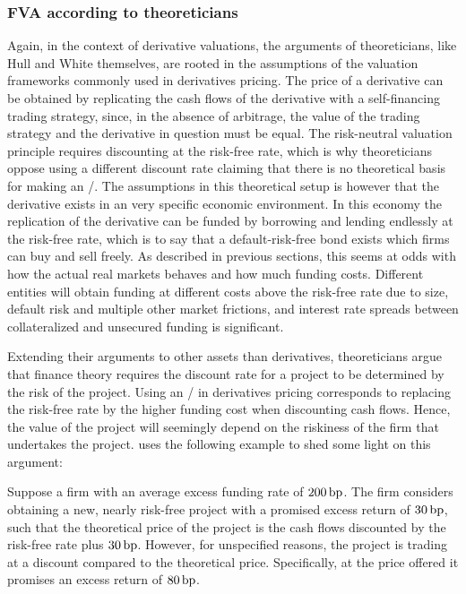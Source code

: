 \documentclass[./sub-main.tex]{subfiles}
\begin{document}
        \subsubsection{FVA according to theoreticians}
            Again, in the context of derivative valuations, 
            the arguments of theoreticians, like Hull and White themselves, 
            are rooted in the assumptions of the valuation frameworks commonly used in derivatives pricing.
            The price of a derivative can be obtained by replicating the cash flows of the derivative 
            with a self-financing trading strategy, since, in the absence of arbitrage, 
            the value of the trading strategy and the derivative in question must be equal.
            The risk-neutral valuation principle requires discounting at the risk-free rate,
            which is why theoreticians oppose using a different discount rate
            claiming that there is no theoretical basis for making an \FVA/.
            The assumptions in this theoretical setup is however 
            that the derivative exists in an very specific economic environment. 
            In this economy the replication of the derivative
            can be funded by borrowing and lending endlessly at the risk-free rate,
            which is to say that a default-risk-free bond exists which firms can buy and sell freely.
            As described in previous sections,
            this seems at odds with how the actual real markets behaves and how much funding costs.
            Different entities will obtain funding at different costs above the risk-free rate due to size,
            default risk and multiple other market frictions,
            and interest rate spreads between collateralized and unsecured funding is significant.

            Extending their arguments to other assets than derivatives, 
            theoreticians argue that finance theory requires the discount rate for a project 
            to be determined by the risk of the project.
            Using an \FVA/ in derivatives pricing corresponds to replacing the risk-free rate by the higher funding cost
            when discounting cash flows.
            Hence, the value of the project will seemingly depend on the riskiness of the firm that undertakes the project.
            \cite{HullWhite2012FVA} uses the following example to shed some light on this argument:

            Suppose a firm with an average excess funding rate of $200\,\text{bp}$. 
            The firm considers obtaining a new, nearly risk-free project with a promised excess return of $30\,\text{bp}$,
            such that the theoretical price of the project is the cash flows 
            discounted by the risk-free rate plus $30\,\text{bp}$.
            However, for unspecified reasons, the project is trading at a discount compared to the theoretical price.
            Specifically, at the price offered it promises an excess return of $80\,\text{bp}$.
            
\end{document}
